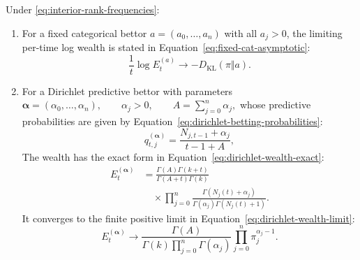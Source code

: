 \begin{proposition}
Under \eqref{eq:interior-rank-frequencies}:

\begin{enumerate}[label=(\alph*),leftmargin=*]
\item For a fixed categorical bettor \(a=(a_0,\ldots,a_n)\) with all \(a_j>0\), the limiting per-time log wealth is stated in Equation~\eqref{eq:fixed-cat-asymptotic}:
\begin{equation}
  \frac1t\log E_t^{(a)}
  \longrightarrow
  -D_{\mathrm{KL}}(\pi\Vert a).
  \label{eq:fixed-cat-asymptotic}
\end{equation}

\item For a Dirichlet predictive bettor with parameters
\(\boldsymbol\alpha=(\alpha_0,\ldots,\alpha_n), \qquad \alpha_j>0, \qquad A=\sum_{j=0}^n\alpha_j,\)
whose predictive probabilities are given by Equation~\eqref{eq:dirichlet-betting-probabilities}:
\begin{equation}
q_{t,j}^{(\boldsymbol\alpha)}
  =
  \frac{N_{j,t-1}+\alpha_j}{t-1+A},
  \label{eq:dirichlet-betting-probabilities}
\end{equation}
The wealth has the exact form in Equation~\eqref{eq:dirichlet-wealth-exact}:
\begin{equation}
\begin{aligned}
E_t^{(\boldsymbol\alpha)}
&=\frac{\Gamma(A)\Gamma(k+t)}
        {\Gamma(A+t)\Gamma(k)}\\
&\quad\times\prod_{j=0}^n
  \frac{\Gamma(N_j(t)+\alpha_j)}
       {\Gamma(\alpha_j)\Gamma(N_j(t)+1)}.
\end{aligned}
\label{eq:dirichlet-wealth-exact}
\end{equation}
It converges to the finite positive limit in Equation~\eqref{eq:dirichlet-wealth-limit}:
\begin{equation}
  E_t^{(\boldsymbol\alpha)}
  \longrightarrow
  \frac{\Gamma(A)}
       {\Gamma(k)\prod_{j=0}^n\Gamma(\alpha_j)}
  \prod_{j=0}^n
  \pi_j^{\alpha_j-1}.
  \label{eq:dirichlet-wealth-limit}
\end{equation}
\end{enumerate}
\end{proposition}

